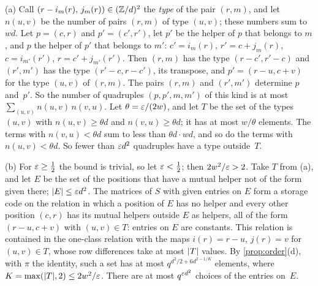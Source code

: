 \begin{informalproof}
(a) Call $(r-i_m(r),\,j_m(r))\in(\mathbb{Z}/d)^2$ the \emph{type} of the pair $(r,m)$, and let $n(u,v)$ be the number of
pairs $(r,m)$ of type $(u,v)$; these numbers sum to $wd$. Let $p=(c,r)$ and $p'=(c',r')$, let $p'$ be the helper of
$p$ that belongs to $m$, and $p$ the helper of $p'$ that belongs to $m'$: $c'=i_m(r)$, $r'=c+j_m(r)$, $c=i_{m'}(r')$,
$r=c'+j_{m'}(r')$. Then $(r,m)$ has the type $(r-c',r'-c)$ and $(r',m')$ has the type $(r'-c,r-c')$, its transpose,
and $p'=(r-u,c+v)$ for the type $(u,v)$ of $(r,m)$. The pairs $(r,m)$ and $(r',m')$ determine $p$ and~$p'$. So the
number of quadruples $(p,p',m,m')$ of this kind is at most $\sum_{(u,v)}n(u,v)\,n(v,u)$. Let $\theta=\varepsilon/(2w)$, and
let $T$ be the set of the types $(u,v)$ with $n(u,v)\ge\theta d$ and $n(v,u)\ge\theta d$; it has at most
$w/\theta$ elements. The terms with $n(v,u)<\theta d$ sum to less than $\theta d\cdot wd$, and so do the terms with
$n(u,v)<\theta d$. So fewer than $\varepsilon d^2$ quadruples have a type outside~$T$.

(b) For $\varepsilon\ge\tfrac12$ the bound is trivial, so let $\varepsilon<\tfrac12$; then $2w^2/\varepsilon>2$. Take $T$ from (a), and let $E$ be the set of the positions that have a mutual helper not of the form given
there; $\lvert E \rvert\le\varepsilon d^2$. The matrices of $S$ with given entries on $E$ form a storage code on the relation in
which a position of $E$ has no helper and every other position $(c,r)$ has its mutual helpers outside $E$ as
helpers, all of the form $(r-u,c+v)$ with $(u,v)\in T$: entries on $E$ are constants. This relation is contained in
the one-class relation with the maps $i(r)=r-u$, $j(r)=v$ for $(u,v)\in T$, whose row differences take at most
$\lvert T \rvert$ values. By \cref{prop:order}(d), with $\pi$ the identity, such a set has at most
$q^{d^2/2+6d^{2-1/K}}$ elements, where $K=\max(\lvert T \rvert,2)\le2w^2/\varepsilon$. There are at most $q^{\varepsilon d^2}$ choices of
the entries on~$E$.


\end{informalproof}
